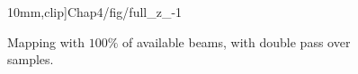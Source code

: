 \begin{figure}[ht]
{{{    10mm},clip]{Chap4/fig/full_z_-1}}}%
    \\%
    \hfill {}%
    \caption{Mapping with $100\%$ of available beams, with double pass over
    samples.}%
    \label{fig:full_map}%
\end{figure}

